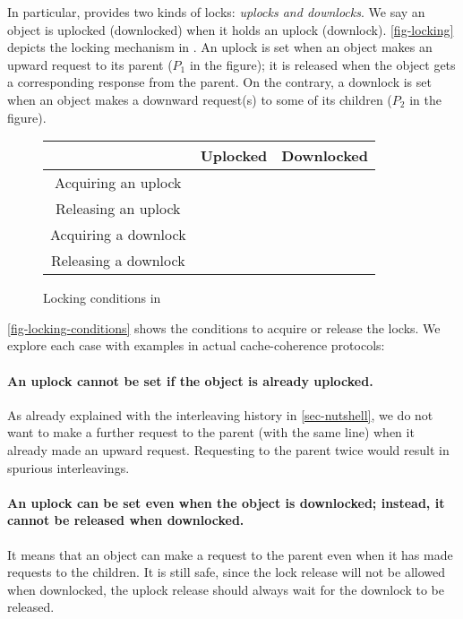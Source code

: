 In particular, \hemiola{} provides two kinds of locks: \emph{uplocks and downlocks}.
We say an object is uplocked (downlocked) when it holds an uplock (downlock).
\autoref{fig-locking} depicts the locking mechanism in \hemiola{}.
An uplock is set when an object makes an upward request to its parent ($P_1$ in the figure); it is released when the object gets a corresponding response from the parent.
On the contrary, a downlock is set when an object makes a downward request(s) to some of its children ($P_2$ in the figure).

\begin{figure}[h]
  \centering
  \renewcommand{\arraystretch}{1.2}
  \newcommand{\lockyes}{\cmark}
  \newcommand{\lockno}{\xmark}
  \begin{tabular}{ccc}
    \hline
    & Uplocked & Downlocked\\
    \hline
    Acquiring an uplock & \lockno & \lockyes\\
    Releasing an uplock & \lockyes & \lockno\\
    Acquiring a downlock & \lockyes & \lockno\\
    Releasing a downlock & \lockyes & \lockyes\\
    \hline
  \end{tabular}
  \caption{Locking conditions in \hemiola{}}
  \label{fig-locking-conditions}
\end{figure}

\autoref{fig-locking-conditions} shows the conditions to acquire or release the locks.
We explore each case with examples in actual cache-coherence protocols:

\paragraph{An uplock cannot be set if the object is already uplocked.}
As already explained with the interleaving history in \autoref{sec-nutshell}, we do not want to make a further request to the parent (with the same line) when it already made an upward request.
Requesting to the parent twice would result in spurious interleavings.

\paragraph{An uplock can be set even when the object is downlocked; instead, it cannot be released when downlocked.}
It means that an object can make a request to the parent even when it has made requests to the children.
It is still safe, since the lock release will not be allowed when downlocked, \ie{} the uplock release should always wait for the downlock to be released.

